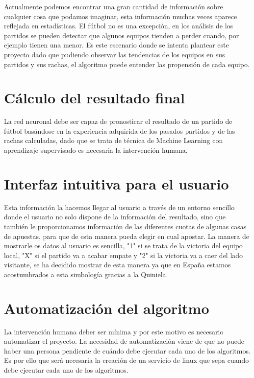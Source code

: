 
Actualmente podemos encontrar una gran cantidad de información sobre cualquier cosa que podamos imaginar, esta información muchas veces aparece reflejada en estadísticas. El fútbol no es una excepción, en los análisis de los partidos se pueden detectar que algunos equipos tienden a perder cuando, por ejemplo tienen una menor. Es este escenario donde se intenta plantear este proyecto dado que pudiendo observar las tendencias de los equipos en sus partidos y sus rachas, el algoritmo puede entender las propensión de cada equipo.

\section{Cálculo del resultado final}

La red neuronal debe ser capaz de pronosticar el resultado de un partido de fútbol basándose en la experiencia adquirida de los pasados partidos y de las rachas calculadas, dado que se trata de técnica de Machine Learning con aprendizaje supervisado es necesaria la intervención humana.

\section{Interfaz intuitiva para el usuario}

Esta información la hacemos llegar al usuario a través de un entorno sencillo donde el usuario no solo dispone de la información del resultado, sino que también le proporcionamos información de las diferentes cuotas de algunas casas de apuestas, para que de esta manera pueda elegir en cual apostar. La manera de mostrarle os datos al usuario es sencilla, "1" si se trata de la victoria del equipo local, "X" si el partido va a acabar empate y "2" si la victoria va a caer del lado visitante, se ha decidido mostrar de esta manera ya que en España estamos acostumbrados a esta simbología gracias a la Quiniela.

\section{Automatización del algoritmo}
La intervención humana deber ser mínima y por este motivo es necesario automatizar el proyecto. La necesidad de automatización viene de que no puede haber una persona pendiente de cuándo debe ejecutar cada uno de los algoritmos.
Es por ello que será necesaria la creación de un servicio de linux que sepa cuando debe ejecutar cada uno de los algoritmos.
